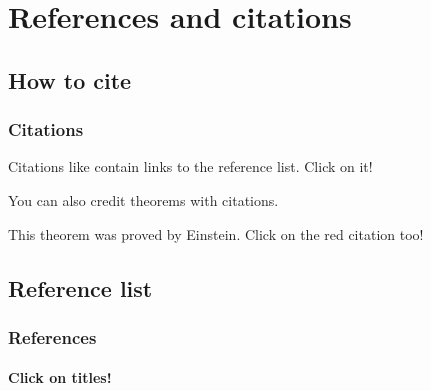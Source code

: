 \documentclass{beamer}
\begin{document}
\section{References and citations}

\subsection{How to cite}

\begin{frame}
    \frametitle{Citations}

    Citations like \cite{knuth-fa} contain links to the reference list. Click on it!

    You can also credit theorems with citations.

    \begin{theorem}
        This theorem was proved by Einstein. Click on the red citation too!
    \end{theorem}

\end{frame}

\subsection{Reference list}

\begin{frame}
    \frametitle{References}
    \framesubtitle{Click on titles!}
    \nocite{*}
    \printbibliography[heading=none]
\end{frame}
\end{document}

